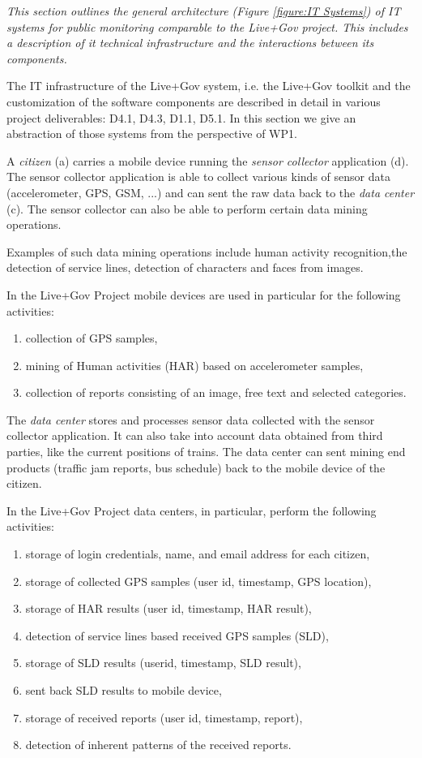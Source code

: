 \documentclass[runningheads,a4paper]{llncs}
\newenvironment{LGContent}
{ \par\color{blue} \it \small }
{ \par }
\begin{document}
\begin{LGContent}
This section outlines the general architecture (Figure \ref{figure:IT Systems}) of IT systems for public monitoring comparable to the Live+Gov project.
This includes a description of it technical infrastructure and the interactions between its components.

The IT infrastructure of the Live+Gov system, i.e. the Live+Gov toolkit and the customization of the software components are described in detail in various project deliverables: D4.1, D4.3, D1.1, D5.1.
In this section we give an abstraction of those systems from the perspective of WP1.



A \emph{citizen} (a) carries a mobile device running the \emph{sensor collector} application (d).
The sensor collector application is able to collect various kinds of sensor data (accelerometer, GPS, GSM, ...) and can sent the raw data back to the \emph{data center} (c).
The sensor collector can also be able to perform certain data mining operations.

Examples of such data mining operations include human activity recognition,the detection of service lines, detection of characters and faces from images.

In the Live+Gov Project mobile devices are used in particular for the following activities:
\begin{enumerate}
\item collection of GPS samples,
\item mining of Human activities (HAR) based on accelerometer samples,
\item collection of reports consisting of an image, free text and selected categories.
\end{enumerate}

The \emph{data center} stores and processes sensor data collected with the sensor collector application. It can also take into account data obtained from third parties, like the current positions of trains.
The data center can sent mining end products (traffic jam reports, bus schedule) back to the mobile device of the citizen.

In the Live+Gov Project data centers, in particular, perform the following activities:
\begin{enumerate}
\item storage of login credentials, name, and email address for each citizen,
\item storage of collected GPS samples (user id, timestamp, GPS location),
\item storage of HAR results (user id, timestamp, HAR result),
\item detection of service lines based received GPS samples (SLD),
\item storage of SLD results (userid, timestamp, SLD result),
\item sent back SLD results to mobile device,
\item storage of received reports (user id, timestamp, report),
\item detection of inherent patterns of the received reports.
\end{enumerate}


\end{LGContent}
\end{document}

